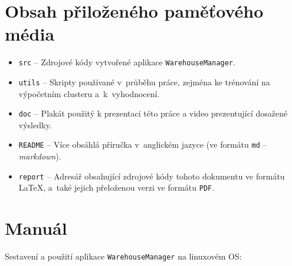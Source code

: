 

\chapter{Obsah přiloženého paměťového média}

\begin{itemize}
    \item \texttt{src} -- Zdrojové kódy vytvořené aplikace \texttt{WarehouseManager}.
    \item \texttt{utils} -- Skripty používané v~průběhu práce, zejména ke trénování na výpočetním clusteru a~k~vyhodnocení.
    \item \texttt{doc} -- Plakát použitý k prezentaci této práce a video prezentující dosažené výsledky.
    \item \texttt{README} -- Více obsáhlá příručka v~anglickém jazyce (ve formátu \texttt{md} -- \emph{markdown}).
    \item \texttt{report} -- Adresář obsahující zdrojové kódy tohoto dokumentu ve formátu \LaTeX, a~také jejich přeloženou verzi ve formátu \texttt{PDF}.
\end{itemize}


\chapter{Manuál}

Sestavení a použití aplikace \texttt{WarehouseManager} na linuxovém OS:

